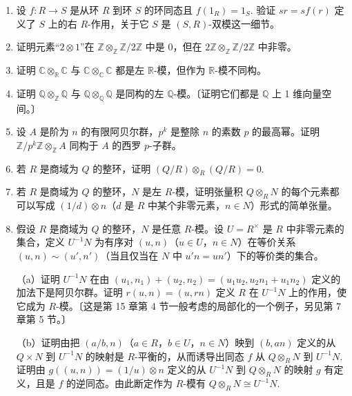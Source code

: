 \begin{enumerate}
\item 设 \(f : R \to S\) 是从环 \(R\) 到环 \(S\) 的环同态且 \(f(1_R) = 1_S\). 验证 \(sr = sf(r)\) 定义了 \(S\) 上的右 \(R\)-作用，关于它 \(S\) 是 \((S, R)\)-双模这一细节。

\item 证明元素“\(2 \otimes 1\)”在 \(\mathbb{Z} \otimes_{\mathbb{Z}} \mathbb{Z}/2\mathbb{Z}\) 中是 0，但在 \(2\mathbb{Z} \otimes_{\mathbb{Z}} \mathbb{Z}/2\mathbb{Z}\) 中非零。

\item 证明 \(\mathbb{C} \otimes_{\mathbb{R}} \mathbb{C}\) 与 \(\mathbb{C} \otimes_{\mathbb{C}} \mathbb{C}\) 都是左 \(\mathbb{R}\)-模，但作为 \(\mathbb{R}\)-模不同构。

\item 证明 \(\mathbb{Q} \otimes_{\mathbb{Z}} \mathbb{Q}\) 与 \(\mathbb{Q} \otimes_{\mathbb{Q}} \mathbb{Q}\) 是同构的左 \(\mathbb{Q}\)-模。〔证明它们都是 \(\mathbb{Q}\) 上 1 维向量空间。〕

\item 设 \(A\) 是阶为 \(n\) 的有限阿贝尔群，\(p^k\) 是整除 \(n\) 的素数 \(p\) 的最高幂。证明 \(\mathbb{Z}/p^k\mathbb{Z} \otimes_{\mathbb{Z}} A\) 同构于 \(A\) 的西罗 \(p\)-子群。

\item 若 \(R\) 是商域为 \(Q\) 的整环，证明 \((Q/R) \otimes_R (Q/R) = 0\).

\item 若 \(R\) 是商域为 \(Q\) 的整环，\(N\) 是左 \(R\)-模，证明张量积 \(Q \otimes_R N\) 的每个元素都可以写成 \((1/d) \otimes n\)（\(d\) 是 \(R\) 中某个非零元素，\(n \in N\)）形式的简单张量。

\item 假设 \(R\) 是商域为 \(Q\) 的整环，\(N\) 是任意 \(R\)-模。设 \(U = R^\times\) 是 \(R\) 中非零元素的集合，定义 \(U^{-1}N\) 为有序对 \((u, n)\)（\(u \in U\)，\(n \in N\)）在等价关系 \((u, n) \sim (u', n')\)（当且仅当在 \(N\) 中 \(u'n = un'\)）下的等价类的集合。

（a）证明 \(U^{-1}N\) 在由 \((u_1, n_1)+(u_2, n_2) = (u_1u_2, u_2n_1+u_1n_2)\) 定义的加法下是阿贝尔群。证明 \(r(u, n) = (u, rn)\) 定义 \(R\) 在 \(U^{-1}N\) 上的作用，使它成为 \(R\)-模。〔这是第 15 章第 4 节一般考虑的局部化的一个例子，另见第 7 章第 5 节。〕

（b）证明由把 \((a/b, n)\)（\(a \in R\)，\(b \in U\)，\(n \in N\)）映到 \((b, an)\) 定义的从 \(Q \times N\) 到 \(U^{-1}N\) 的映射是 \(R\)-平衡的，从而诱导出同态 \(f\) 从 \(Q \otimes_R N\) 到 \(U^{-1}N\). 证明由 \(g((u, n)) = (1/u) \otimes n\) 定义的从 \(U^{-1}N\) 到 \(Q \otimes_R N\) 的映射 \(g\) 有定义，且是 \(f\) 的逆同态。由此断定作为 \(R\)-模有 \(Q \otimes_R N \cong U^{-1}N\).


\end{enumerate}
